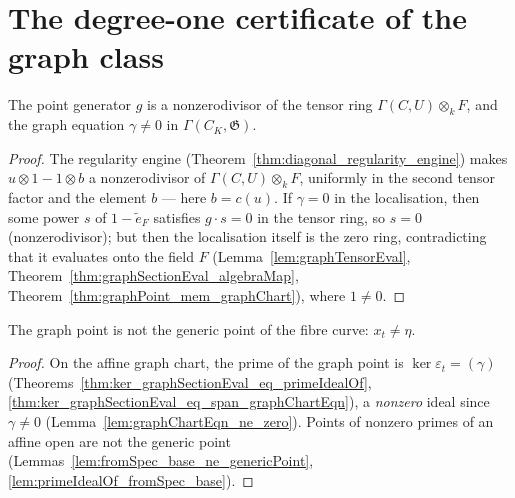 \section{The degree-one certificate of the graph class}
\label{sec:graphDegree}

\begin{lemma}
  \label{lem:graphChartEqn_ne_zero}
  \leanok
  The point generator \(g\) is a nonzerodivisor of the tensor ring
  \(\Gamma(C,U) \otimes_k F\), and the graph equation \(\gamma \neq 0\) in
  \(\Gamma(C_K, \mathfrak G)\).
\end{lemma}
\begin{proof}
  \leanok
  The regularity engine (Theorem~\ref{thm:diagonal_regularity_engine}) makes
  \(u \otimes 1 - 1 \otimes b\) a nonzerodivisor of \(\Gamma(C,U) \otimes_k F\), uniformly
  in the second tensor factor and the element \(b\) — here \(b = c(u)\). If \(\gamma = 0\)
  in the localisation, then some power \(s\) of \(1 - \tilde e_F\) satisfies \(g \cdot s = 0\)
  in the tensor ring, so \(s = 0\) (nonzerodivisor); but then the localisation itself is
  the zero ring, contradicting that it evaluates onto the field \(F\)
  (Lemma~\ref{lem:graphTensorEval}, Theorem~\ref{thm:graphSectionEval_algebraMap},
  Theorem~\ref{thm:graphPoint_mem_graphChart}), where \(1 \neq 0\).
\end{proof}

\begin{theorem}
  \label{thm:graphPoint_ne_genericPoint}
  \leanok
  The graph point is not the generic point of the fibre curve:
  \(x_t \neq \eta\).
\end{theorem}
\begin{proof}
  \leanok
  On the affine graph chart, the prime of the graph point is
  \(\ker\varepsilon_t = (\gamma)\)
  (Theorems~\ref{thm:ker_graphSectionEval_eq_primeIdealOf},
  \ref{thm:ker_graphSectionEval_eq_span_graphChartEqn}), a \emph{nonzero} ideal since
  \(\gamma \neq 0\) (Lemma~\ref{lem:graphChartEqn_ne_zero}). Points of nonzero primes of an
  affine open are not the generic point
  (Lemmas~\ref{lem:fromSpec_base_ne_genericPoint},
  \ref{lem:primeIdealOf_fromSpec_base}).
\end{proof}


